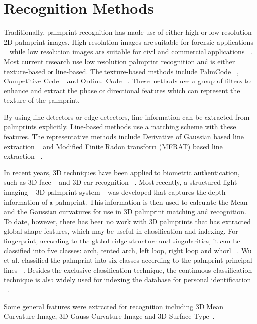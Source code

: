 \section{Recognition Methods}
\label{sec:pastwork:recogmethods}

Traditionally, palmprint recognition has made use of either high or low resolution 2D palmprint images. High resolution images are suitable for forensic applications ~\cite{Jain:2009kj} while low resolution images are suitable for civil and commercial applications ~\cite{Zhang:2003uf}. Most current research use low resolution palmprint recognition and is either texture-based or line-based. The texture-based methods include PalmCode ~\cite{Zhang:2003uf}, Competitive Code ~\cite{Kong:2004wq} and Ordinal Code ~\cite{Zhenan:2005wg}. These methods use a group of filters to enhance and extract the phase or directional features which can represent the texture of the palmprint.

By using line detectors or edge detectors, line information can be extracted from palmprints explicitly. Line-based methods use a matching scheme with these features. The representative methods include Derivative of Gaussian based line extraction ~\cite{Wu:2006wa} and Modified Finite Radon transform (MFRAT) based line extraction ~\cite{Huang:2008ep}.

In recent years, 3D techniques have been applied to biometric authentication, such as 3D face ~\cite{Samir:2006vj} and 3D ear recognition ~\cite{Yan:2007fv}. Most recently, a structured-light imaging ~\cite{Halioua:1984ue,Saldner:1997tu} 3D palmprint system ~\cite{Zhang:2009dp} was developed that captures the depth information of a palmprint. This information is then used to calculate the Mean and the Gaussian curvatures for use in 3D palmprint matching and recognition. To date, however, there has been no work with 3D palmprints that has extracted global shape features, which may be useful in classification and indexing. For fingerprint, according to the global ridge structure and singularities, it can be classified into five classes: arch, tented arch, left loop, right loop and whorl ~\cite{Henry:1900vc}. Wu et al. classified the palmprint into six classes according to the palmprint principal lines ~\cite{Wu:2004kx}. Besides the exclusive classification technique, the continuous classification technique is also widely used for indexing the database for personal identification ~\cite{Lumini:1997vv}.

Some general features were extracted for recognition including 3D Mean Curvature Image, 3D Gauss Curvature Image and 3D Surface Type~\cite{Zhang:2008kc,Li:2009eq}.

